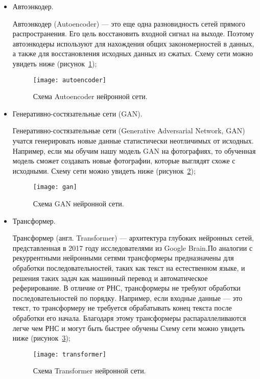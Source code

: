 \documentclass{article}
\begin{document}
\begin{itemize}
		\item Автоэнкодер.
	
		Автоэнкодер (Autoencoder) — это еще одна разновидность сетей прямого распространения. Его цель восстановить входной сигнал на выходе. Поэтому автоэнкодеры используют для нахождения общих закономерностей в данных, а также для восстановления исходных данных из сжатых.  Схему сети можно увидеть ниже (рисунок~\ref{autoencoder});
	
		\begin{figure}[H]
			\begin{center}
				\texttt{[image: autoencoder]}
				\caption{Схема Autoencoder нейронной сети.} 
				\label{autoencoder}
			\end{center}
		\end{figure}
	
		\item Генеративно-состязательные сети (GAN).
	
		Генеративно-состязательные сети (Generative Adversarial Network, GAN) учатся генерировать новые данные статистически неотличимых от исходных. Например, если мы обучим нашу модель GAN на фотографиях, то обученная модель сможет создавать новые фотографии, которые выглядят схоже с исходными.  Схему сети можно увидеть ниже (рисунок~\ref{gan});
	
		\begin{figure}[H]
			\begin{center}
				\texttt{[image: gan]}
				\caption{Схема GAN нейронной сети.} 
				\label{gan}
			\end{center}
		\end{figure}
	
		\item Трансформер.
	
		Трансформер (англ. Transformer) — архитектура глубоких нейронных сетей, представленная в 2017 году исследователями из Google Brain.По аналогии с рекуррентными нейронными сетями  трансформеры предназначены для обработки последовательностей, таких как текст на естественном языке, и решения таких задач как машинный перевод и автоматическое реферирование. В отличие от РНС, трансформеры не требуют обработки последовательностей по порядку. Например, если входные данные — это текст, то трансформеру не требуется обрабатывать конец текста после обработки его начала. Благодаря этому трансформеры распараллеливаются легче чем РНС и могут быть быстрее обучены  Схему сети можно увидеть ниже (рисунок~\ref{transformer});
	
		\begin{figure}[H]
			\begin{center}
				\texttt{[image: transformer]}
				\caption{Схема Transformer нейронной сети.} 
				\label{transformer}
			\end{center}
		\end{figure}	
	
	\end{itemize}
\end{document}
